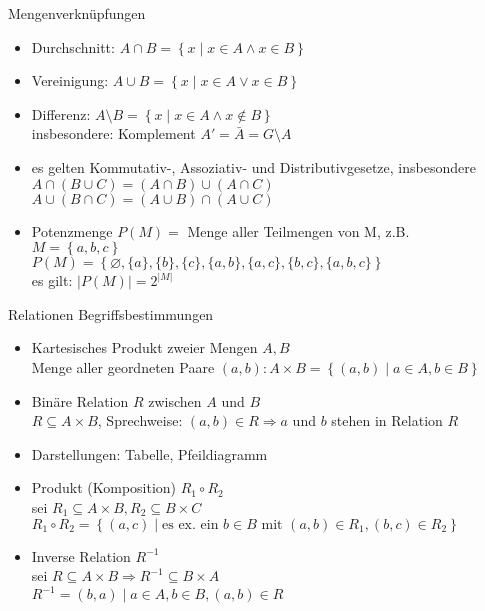 \begin{frame}{Mengenverknüpfungen}
	\begin{itemize}
		\item Durchschnitt: $A \cap B = \left\{x \mid x \in A \land x \in B\right\}$
		\item Vereinigung: $A \cup B = \left\{x \mid x \in A \lor x \in B\right\}$
		\item Differenz: $A \setminus B = \left\{x \mid x \in A \land x \notin B\right\}$\\
			insbesondere: Komplement $A'= \bar{A} = G \setminus A$
		\item es gelten Kommutativ-, Assoziativ- und Distributivgesetze, insbesondere\\
			$A \cap \left(B \cup C\right) = \left(A \cap B\right) \cup \left(A \cap C\right)$\\
			$A \cup \left(B \cap C\right) = \left(A \cup B\right) \cap \left(A \cup C\right)$
		\item Potenzmenge $P(M) =$ Menge aller Teilmengen von M, z.B.\\
			$M=\left\{a, b, c\right\}$\\
			$P(M)=\left\{\varnothing, \{a\}, \{b\}, \{c\}, \{a,b\}, \{a,c\}, \{b,c\}, \{a,b,c\}\right\}$\\
			es gilt: $|P(M)|=2^{|M|}$
	\end{itemize}
\end{frame}

\begin{frame}{Relationen}
	Begriffsbestimmungen
	\begin{itemize}
		\item Kartesisches Produkt zweier Mengen $A, B$\\
			Menge aller geordneten Paare $(a,b): A \times B = \left\{(a,b) \mid a \in A, b \in B\right\}$
		\item Binäre Relation $R$ zwischen $A$ und $B$\\
			$R \subseteq A \times B$, Sprechweise: $(a,b) \in R \Rightarrow a$ und $b$ stehen in Relation $R$
		\item Darstellungen: Tabelle, Pfeildiagramm
		\item Produkt (Komposition) $R_1 \circ R_2$\\
			sei $R_1 \subseteq A \times B, R_2 \subseteq B \times C$\\
			$R_1 \circ R_2 = \left\{(a,c) \mid \textrm{es ex. ein } b \in B \textrm{ mit } (a,b) \in R_1, (b,c) \in R_2\right\}$
		\item Inverse Relation $R^{-1}$\\
			sei $R \subseteq A \times B \Rightarrow R^{-1}\subseteq B \times A$\\
			$R^{-1}=(b,a) \mid a \in A, b \in B, (a,b) \in R$
	\end{itemize}
\end{frame}

